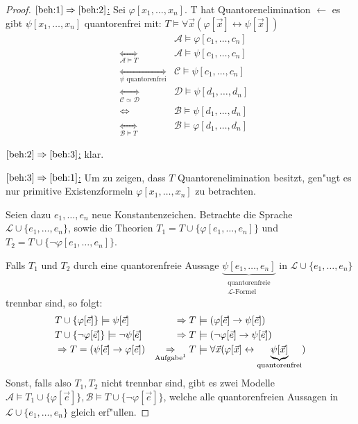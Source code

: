 \documentclass[a4paper,12pt,numbers=noenddot,parskip=full]{scrartcl}
\newcommand{\scrL}{\mathcal{L}}
\newcommand{\scrA}{\mathcal{A}}
\newcommand{\scrB}{\mathcal{B}}
\newcommand{\scrC}{\mathcal{C}}
\newcommand{\scrD}{\mathcal{D}}
\theoremstyle{dotless}
\begin{document}
\begin{proof}
	\underline{$\ref{beh:1}\Rightarrow\ref{beh:2}$:} Sei $\varphi[x_1, \dots, x_n]$. T hat Quantorenelimination $\longleftarrow$ es gibt $\psi[x_1, \dots, x_n]$ quantorenfrei mit: $T \models \forall \vec{x} (\varphi[\vec{x}] \leftrightarrow \psi[\vec{x}])$
	\begin{align*}
		&&\scrA \models \varphi[c_1, \dots, c_n]\\
		&\underset{\scrA \models T}{\Leftrightarrow} &\scrA \models \psi[c_1, \dots, c_n]\\
		&\underset{\psi \text{ quantorenfrei}}{\Leftrightarrow} &\scrC \models \psi[c_1, \dots, c_n]\\
		&\underset{\scrC \simeq \scrD}{\Leftrightarrow} &\scrD \models \psi[d_1, \dots, d_n]\\
		&\Leftrightarrow &\scrB \models \psi[d_1, \dots, d_n]\\
		&\underset{\scrB \models T}{\Leftrightarrow} &\scrB \models \varphi[d_1, \dots, d_n]
	\end{align*}
	
	\underline{$\ref{beh:2} \Rightarrow \ref{beh:3}$:} klar.
	
	\underline{$\ref{beh:3} \Rightarrow \ref{beh:1}$:} Um zu zeigen, dass $T$ Quantorenelimination besitzt, gen"ugt es nur primitive Existenzformeln $\varphi[x_1, \dots, x_n]$ zu betrachten. 
	
	Seien dazu $e_1, \dots, e_n$ neue Konstantenzeichen. Betrachte die Sprache $\scrL \cup \{e_1, \dots, e_n \}$, sowie die Theorien $T_1 = T \cup \{\varphi[e_1, \dots, e_n] \}$ und $T_2 = T \cup \{\lnot \varphi[e_1, \dots, e_n]\}$.
	
	Falls $T_1$ und $T_2$ durch eine quantorenfreie Aussage $\underbrace{\psi[e_1, \dots, e_n]}_{\substack{\text{quantorenfreie}\\ \scrL \text{-Formel}}}$ in $\scrL \cup \{e_1, \dots, e_n \}$ trennbar sind, so folgt:
	\begin{align*}
		&T \cup \{\varphi[\vec{e}] \} \models \psi[\vec{e}] &\Rightarrow T &\models (\varphi[\vec{e}] \rightarrow \psi[\vec{e}])\\
		&T \cup \{\lnot\varphi[\vec{e}] \} \models \lnot\psi[\vec{e}] &\Rightarrow T &\models (\lnot\varphi[\vec{e}] \rightarrow \psi[\vec{e}])\\
		&\Rightarrow T = (\psi[\vec{e}] \rightarrow \varphi[\vec{e}]) &\underset{\text{Aufgabe\footnotemark}}{\Rightarrow} T &\models \forall \vec{x} (\varphi[\vec{x}] \leftrightarrow \underbrace{\psi[\vec{x}]}_{\text{quantorenfrei}})
	\end{align*}
	Sonst, falls also $T_1, T_2$ nicht trennbar sind, gibt es zwei Modelle $\scrA \models T_1 \cup \{\varphi[\vec{e}] \}, \scrB \models T \cup \{\lnot \varphi[\vec{e}] \}$, welche alle quantorenfreien Aussagen in $\scrL \cup \{e_1, \dots, e_n \}$ gleich erf"ullen.
	

\end{proof}
\end{document}
